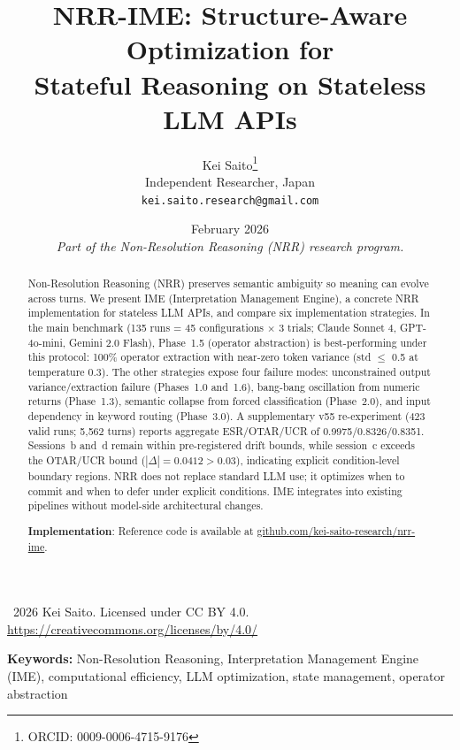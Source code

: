 \documentclass[11pt,a4paper]{article}
\title{\textbf{NRR-IME: Structure-Aware Optimization for\\Stateful Reasoning on Stateless LLM APIs}}
\author{
  Kei Saito\thanks{ORCID: 0009-0006-4715-9176} \\
  Independent Researcher, Japan \\
  \texttt{kei.saito.research@gmail.com}
}
\date{February 2026 \\[0.5em]
\textit{Part of the Non-Resolution Reasoning (NRR) research program.}}
\begin{document}
\maketitle

\begin{center}
\textcopyright\ 2026 Kei Saito.
Licensed under CC BY 4.0.\\
\url{https://creativecommons.org/licenses/by/4.0/}
\end{center}

\begin{abstract}
Non-Resolution Reasoning (NRR) preserves semantic ambiguity so meaning can evolve
across turns. We present IME (Interpretation Management Engine), a concrete NRR
implementation for stateless LLM APIs, and compare six implementation strategies.
In the main benchmark (135 runs = 45 configurations $\times$ 3 trials; Claude
Sonnet 4, GPT-4o-mini, Gemini 2.0 Flash), Phase~1.5 (operator abstraction) is
best-performing under this protocol: 100\% operator extraction with near-zero
token variance (std $\leq$ 0.5 at temperature 0.3). The other strategies expose
four failure modes: unconstrained output variance/extraction failure (Phases~1.0
and~1.6), bang-bang oscillation from numeric returns (Phase~1.3), semantic
collapse from forced classification (Phase~2.0), and input dependency in keyword
routing (Phase~3.0). A supplementary v55 re-experiment (423 valid runs; 5{,}562
turns) reports aggregate ESR/OTAR/UCR of 0.9975/0.8326/0.8351. Sessions~b and~d
remain within pre-registered drift bounds, while session~c exceeds the OTAR/UCR
bound ($|\Delta|=0.0412 > 0.03$), indicating explicit condition-level boundary
regions. NRR does not replace standard LLM use; it optimizes when to commit and
when to defer under explicit conditions. IME integrates into existing pipelines
without model-side architectural changes.

\textbf{Implementation}: Reference code is available at
\href{https://github.com/kei-saito-research/nrr-ime}{github.com/kei-saito-research/nrr-ime}.
\end{abstract}

\noindent\textbf{Keywords:} Non-Resolution Reasoning, Interpretation Management Engine (IME),
computational efficiency, LLM optimization, state management, operator abstraction

\end{document}
